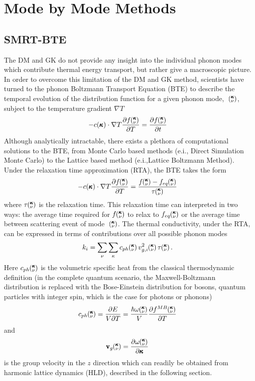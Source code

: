 \section{Mode by Mode Methods}
\subsection{SMRT-BTE}
%
The DM and GK do not provide any insight into the individual phonon modes which contribute thermal energy transport, but rather give a macroscopic picture. In order to overcome this limitation of the DM and GK method, scientists have turned to the phonon Boltzmann Transport Equation (BTE) to describe the temporal evolution of the distribution function for a given phonon mode, ~$\mspace{-4.0mu}\left(\mspace{-8.0mu} \begin{smallmatrix}&\pmb{\kappa} \\&\nu\end{smallmatrix} \mspace{-3.0mu}\right)$, subject to the temperature gradient $\nabla T$ \cite{srivastava1990physics} 
%
\begin{equation}\label{EQ:BTE}
-c(\pmb{\kappa})\cdot \nabla T\frac{\partial f\mspace{-4.0mu}\left(\mspace{-8.0mu} \begin{smallmatrix}&\pmb{\kappa} \\&\nu\end{smallmatrix} \mspace{-3.0mu}\right)}{\partial T}=\frac{\partial f\mspace{-4.0mu}\left(\mspace{-8.0mu} \begin{smallmatrix}&\pmb{\kappa} \\&\nu\end{smallmatrix} \mspace{-3.0mu}\right)}{\partial t}
\end{equation}
%
Although analytically intractable, there exists a plethora of computational solutions to the BTE, from Monte Carlo based methods (e.i., Direct Simulation Monte Carlo)\cite{mazumder2001monte} to the Lattice based method (e.i.,Lattice Boltzmann Method)\cite{nabovati2011lattice}. Under the relaxation time approximation (RTA), the BTE takes the form
%
\begin{equation}\label{EQ:BTE_lin}
-c(\pmb{\kappa})\cdot \nabla T\frac{\partial f\kv}{\partial T}=\frac{f\kv-f_{eq}\kv}{\tau \kv}
\end{equation}
%
where $\tau \mspace{-4.0mu}\left(\mspace{-8.0mu} \begin{smallmatrix}&\pmb{\kappa} \\&\nu\end{smallmatrix} \mspace{-3.0mu}\right)$ is the relaxation time. This relaxation time can interpreted in two ways: the average time required for $f\mspace{-4.0mu}\left(\mspace{-8.0mu} \begin{smallmatrix}&\pmb{\kappa} \\&\nu\end{smallmatrix} \mspace{-3.0mu}\right)$ to relax to $f_{eq}\mspace{-4.0mu}\left(\mspace{-8.0mu} \begin{smallmatrix}&\pmb{\kappa} \\&\nu\end{smallmatrix} \mspace{-3.0mu}\right)$ or the average time between scattering event of mode ~$\mspace{-4.0mu}\left(\mspace{-8.0mu} \begin{smallmatrix}&\pmb{\kappa} \\&\nu\end{smallmatrix} \mspace{-3.0mu}\right)$. The thermal conductivity, under the RTA, can be expressed in terms of contributions over all possible phonon modes \cite{srivastava1990physics}
%
\begin{equation}\label{EQ:k_RTA}
	k_{i}= \sum_\nu\sum_\kappa c_{ph}\kv v^2_{g,i}\kv\tau\kv.
\end{equation}
%
Here $c_{ph}\mspace{-4.0mu}\left(\mspace{-8.0mu} \begin{smallmatrix}&\pmb{\kappa} \\&\nu\end{smallmatrix} \mspace{-3.0mu}\right)$ is the volumetric specific heat from the classical thermodynamic definition (in the complete quantum scenario, the Maxwell-Boltzmann distribution is replaced with the Bose-Einstein distribution for bosons, quantum particles with integer spin, which is the case for photons or phonons)
%
\begin{equation}\label{EQ:Cph}
c_{ph}\kv=\frac{\partial E}{V\partial T}=\frac{\hbar\omega\kv}{V}\frac{\partial f^{MB}\kv}{\partial T}	
\end{equation}
%
and
\begin{equation}\label{EQ:Vg}
\pmb{\mathrm{v}}_{g}\mspace{-4.0mu}\left(\mspace{-8.0mu} \begin{smallmatrix}&\pmb{\kappa} \\&\nu\end{smallmatrix} \mspace{-3.0mu}\right)=\frac{\partial \omega \mspace{-4.0mu}\left(\mspace{-8.0mu} \begin{smallmatrix}&\pmb{\kappa} \\&\nu\end{smallmatrix} \mspace{-3.0mu}\right)}{\partial \pmb{\kappa}}
\end{equation}
is the group velocity in the $z$ direction which can readily be obtained from harmonic lattice dynamics (HLD), described in the following section. 

